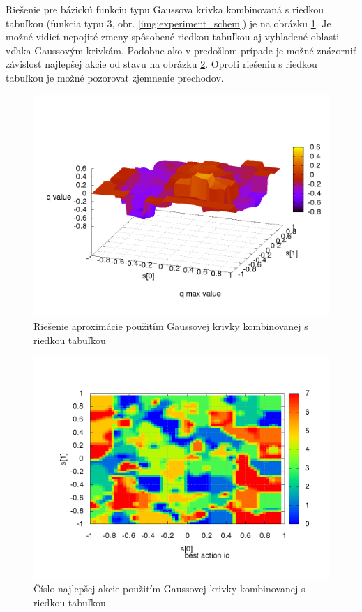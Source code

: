 \newpage
Riešenie pre bázickú funkciu typu Gaussova krivka kombinovaná s riedkou tabuľkou (funkcia typu 3, obr. \ref{img:experiment_schem}) je na
obrázku \ref{img:experiment_gauss_sparse_table}. Je možné vidieť nepojité zmeny spôsobené riedkou tabuľkou
aj vyhladené oblasti vďaka Gaussovým krivkám. Podobne ako v predošlom prípade je možné znázorniť
závislosť najlepšej akcie od stavu na obrázku \ref{img:experiment_gauss_sparse_table_actions}. Oproti
riešeniu s riedkou tabuľkou je možné pozorovať zjemnenie prechodov.


\begin{figure}[!htb]
\centering
\includegraphics[scale=.4]{../../results_q_learning/map_2/function_type_3/iterations_10/q_learning_result.png}
\caption{Riešenie aproximácie použitím Gaussovej krivky kombinovanej s riedkou tabuľkou}
\label{img:experiment_gauss_sparse_table}
\end{figure}

\begin{figure}[!htb]
\centering
\includegraphics[scale=.4]{../../results_q_learning/map_2/function_type_3/iterations_10/action_best_value_log_surface.png}
\caption{Číslo najlepšej akcie použitím Gaussovej krivky kombinovanej s riedkou tabuľkou}
\label{img:experiment_gauss_sparse_table_actions}
\end{figure}

